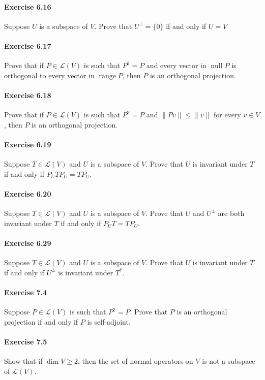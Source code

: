 \documentclass{article}
\begin{document}
\paragraph{Exercise 6.16} Suppose $U$ is a subspace of $V$. Prove that $U^{\perp}=\{0\}$ if and only if $U=V$

\paragraph{Exercise 6.17} Prove that if $P \in \mathcal{L}(V)$ is such that $P^{2}=P$ and every vector in $\operatorname{null} P$ is orthogonal to every vector in $\operatorname{range} P$, then $P$ is an orthogonal projection.

\paragraph{Exercise 6.18} Prove that if $P \in \mathcal{L}(V)$ is such that $P^{2}=P$ and $\|P v\| \leq\|v\|$ for every $v \in V$, then $P$ is an orthogonal projection.

\paragraph{Exercise 6.19} Suppose $T \in \mathcal{L}(V)$ and $U$ is a subspace of $V$. Prove that $U$ is invariant under $T$ if and only if $P_{U} T P_{U}=T P_{U}$.

\paragraph{Exercise 6.20} Suppose $T \in \mathcal{L}(V)$ and $U$ is a subspace of $V$. Prove that $U$ and $U^{\perp}$ are both invariant under $T$ if and only if $P_{U} T=T P_{U}$.

\paragraph{Exercise 6.29} Suppose $T \in \mathcal{L}(V)$ and $U$ is a subspace of $V$. Prove that $U$ is invariant under $T$ if and only if $U^{\perp}$ is invariant under $T^{*}$.

\paragraph{Exercise 7.4} Suppose $P \in \mathcal{L}(V)$ is such that $P^{2}=P$. Prove that $P$ is an orthogonal projection if and only if $P$ is self-adjoint.

\paragraph{Exercise 7.5} Show that if $\operatorname{dim} V \geq 2$, then the set of normal operators on $V$ is not a subspace of $\mathcal{L}(V)$.
\end{document}
